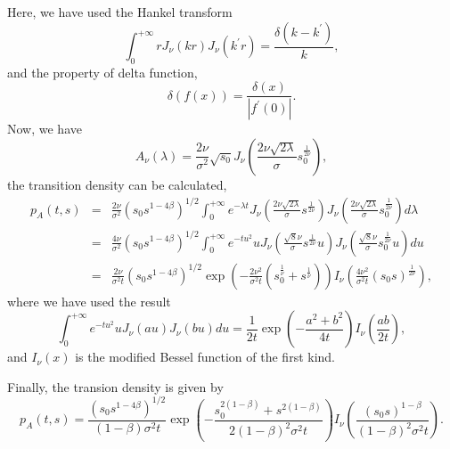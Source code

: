 \documentclass[12pt]{article}
\begin{document}
  Here, we have used the Hankel transform
  \begin{equation}
    \int_0^{+\infty}rJ_{\nu}(kr)J_{\nu}(k^{\prime}r)=\frac{\delta(k-k^{\prime})}{k},
  \end{equation}
  and the property of delta function,
  \begin{equation}
    \delta\left(f(x)\right)=\frac{\delta(x)}{|f^{\prime}(0)|}.
  \end{equation}
  Now, we have
  $$
    A_{\nu}(\lambda)=\frac{2\nu}{\sigma^2}\sqrt{s_0}J_{\nu}\left(\frac{2\nu\sqrt{2\lambda}}{\sigma}s_0^{\frac{1}{2\nu}}\right),
  $$
  the transition density can be calculated,
  \begin{eqnarray}
    p_A(t,s) &=& \frac{2\nu}{\sigma^2}\left(s_0s^{1-4\beta}\right)^{1/2}\int_0^{+\infty}e^{-\lambda t}
                J_{\nu}\left(\frac{2\nu\sqrt{2\lambda}}{\sigma}s^{\frac{1}{2\nu}}\right)
                J_{\nu}\left(\frac{2\nu\sqrt{2\lambda}}{\sigma}s_0^{\frac{1}{2\nu}}\right)d\lambda\nonumber\\
           &=& \frac{4\nu}{\sigma^2}\left(s_0s^{1-4\beta}\right)^{1/2}\int_0^{+\infty}e^{-tu^2} u
                J_{\nu}\left(\frac{\sqrt{8}\nu}{\sigma}s^{\frac{1}{2\nu}}u\right)
                J_{\nu}\left(\frac{\sqrt{8}\nu}{\sigma}s_0^{\frac{1}{2\nu}}u\right)du\nonumber\\
           &=& \frac{2\nu}{\sigma^2t}\left(s_0s^{1-4\beta}\right)^{1/2}
               \exp\left(-\frac{2\nu^2}{\sigma^2t}\left(s_0^{\frac{1}{\nu}}+s^{\frac{1}{\nu}}\right)\right)
               I_{\nu}\left(\frac{4\nu^2}{\sigma^2t}\left(s_0s\right)^{\frac{1}{2\nu}}\right),
    \label{density1}
  \end{eqnarray}
  where we have used the result \cite{DLMF1}
  \begin{equation}
    \int_0^{+\infty}e^{-tu^2}uJ_{\nu}(au)J_{\nu}(bu)du=\frac{1}{2t}\exp\left(-\frac{a^2+b^2}{4t}\right)I_{\nu}\left(\frac{ab}{2t}\right),
  \end{equation}
  and $I_{\nu}(x)$ is the modified Bessel function of the first kind.

  Finally, the transion density is given by
  \begin{equation}
    p_A(t,s)=\frac{\left(s_0s^{1-4\beta}\right)^{1/2}}{(1-\beta)\sigma^2t}
    \exp\left(-\frac{s_0^{2(1-\beta)}+s^{2(1-\beta)}}{2(1-\beta)^2\sigma^2t}\right)
    I_{\nu}\left(\frac{\left(s_0s\right)^{1-\beta}}{(1-\beta)^2\sigma^2t}\right).
  \end{equation}
\end{document}
